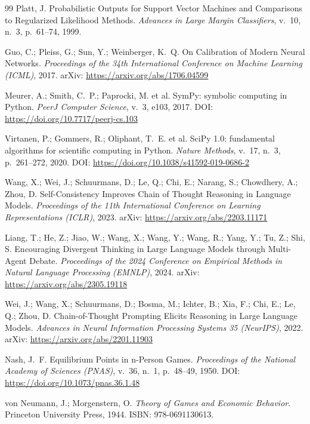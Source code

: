 \documentclass[5p]{elsarticle}
\begin{document}
\begin{thebibliography}{99}
Platt, J. Probabilistic Outputs for Support Vector Machines and Comparisons to Regularized Likelihood Methods. \textit{Advances in Large Margin Classifiers}, v.~10, n.~3, p.~61--74, 1999.

Guo, C.; Pleiss, G.; Sun, Y.; Weinberger, K.~Q. On Calibration of Modern Neural Networks. \textit{Proceedings of the 34th International Conference on Machine Learning (ICML)}, 2017. arXiv: \url{https://arxiv.org/abs/1706.04599}

Meurer, A.; Smith, C.~P.; Paprocki, M. et al. SymPy: symbolic computing in Python. \textit{PeerJ Computer Science}, v.~3, e103, 2017. DOI: \url{https://doi.org/10.7717/peerj-cs.103}

Virtanen, P.; Gommers, R.; Oliphant, T.~E. et al. SciPy 1.0: fundamental algorithms for scientific computing in Python. \textit{Nature Methods}, v.~17, n.~3, p.~261--272, 2020. DOI: \url{https://doi.org/10.1038/s41592-019-0686-2}

Wang, X.; Wei, J.; Schuurmans, D.; Le, Q.; Chi, E.; Narang, S.; Chowdhery, A.; Zhou, D. Self-Consistency Improves Chain of Thought Reasoning in Language Models. \textit{Proceedings of the 11th International Conference on Learning Representations (ICLR)}, 2023. arXiv: \url{https://arxiv.org/abs/2203.11171}

Liang, T.; He, Z.; Jiao, W.; Wang, X.; Wang, Y.; Wang, R.; Yang, Y.; Tu, Z.; Shi, S. Encouraging Divergent Thinking in Large Language Models through Multi-Agent Debate. \textit{Proceedings of the 2024 Conference on Empirical Methods in Natural Language Processing (EMNLP)}, 2024. arXiv: \url{https://arxiv.org/abs/2305.19118}

Wei, J.; Wang, X.; Schuurmans, D.; Bosma, M.; Ichter, B.; Xia, F.; Chi, E.; Le, Q.; Zhou, D. Chain-of-Thought Prompting Elicits Reasoning in Large Language Models. \textit{Advances in Neural Information Processing Systems 35 (NeurIPS)}, 2022. arXiv: \url{https://arxiv.org/abs/2201.11903}

Nash, J.~F. Equilibrium Points in n-Person Games. \textit{Proceedings of the National Academy of Sciences (PNAS)}, v.~36, n.~1, p.~48--49, 1950. DOI: \url{https://doi.org/10.1073/pnas.36.1.48}

von Neumann, J.; Morgenstern, O. \textit{Theory of Games and Economic Behavior}. Princeton University Press, 1944. ISBN: 978-0691130613.


\end{thebibliography}
\end{document}
